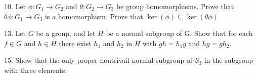 \begin{mdframed}[style=darkQuesion]
  10. Let $\phi: G_{1} \rightarrow G_{2}$ and $\theta: G_{2} \rightarrow G_{3}$ be group homomorphisms. Prove that
  $\theta \phi: G_{1} \rightarrow G_{3}$ is a homomorphism. Prove that $\operatorname{ker}(\phi) \subseteq \operatorname{ker}(\theta \phi)$
\end{mdframed}
\begin{mdframed}[style=darkAnswer,frametitle={Joe Starr}]
\end{mdframed}
\newpage
\begin{mdframed}[style=darkQuesion]
  13. Let $G$ be a group, and let $H$ be a normal subgroup of G. Show that for 
  each $f\in G$ and $h\in H$ there exist $h_1$ and $h_2$ in $H$ with $gh=h_1g$
  and $hg=gh_2$.
\end{mdframed}
\begin{mdframed}[style=darkAnswer,frametitle={Joe Starr}]
\end{mdframed}
\newpage
\begin{mdframed}[style=darkQuesion]
  15. Show that the only proper nontrivail normal subgroup of $S_3$ in the 
  subgroup with three elements. 
\end{mdframed}
\begin{mdframed}[style=darkAnswer,frametitle={Joe Starr}]
\end{mdframed}
